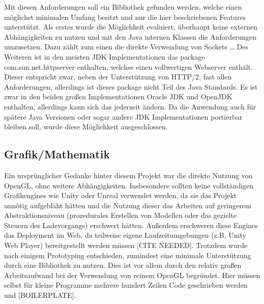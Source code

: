 Mit diesen Anforderungen soll ein Bibliothek gefunden werden, welche einen möglichst minimalen Umfang besitzt und nur die hier beschriebenen Features unterstützt. Als erstes wurde die Möglichkeit evaluiert, überhaupt keine externen Abhängigkeiten zu nutzen und mit den Java internen Klassen die Anforderungen umzusetzen. Dazu zählt zum einen die direkte Verwendung von Sockets …
Des Weiteren ist in den meisten JDK Implementationen das package com.sun.net.httpserver enthalten, welches einen vollwertigen Webserver enthält. Dieser entspricht zwar, neben der Unterstützung von HTTP/2, fast allen Anforderungen, allerdings ist dieses package nicht Teil des Java Standards. Es ist zwar in den beiden großen Implementationen Oracle JDK und OpenJDK enthalten, allerdings kann sich das jederzeit ändern. Da die Anwendung auch für spätere Java Versionen oder sogar andere JDK Implementationen portierbar bleiben soll, wurde diese Möglichkeit ausgeschlossen.


\subsection{Grafik/Mathematik}
Ein ursprünglicher Gedanke hinter diesem Projekt war die direkte Nutzung von OpenGL, ohne weitere Abhängigkeiten. Insbesondere sollten keine vollständigen Grafikengines wie Unity oder Unreal verwendet werden, da sie das Projekt unnötig aufgebläht hätten und die Nutzung dieser das Arbeiten auf geringerem Abstraktionsniveau (prozedurales Erstellen von Modellen oder das gezielte Steuern des Ladevorgangs) erschwert hätten. Außerdem erschweren diese Engines das Deployment im Web, da teilweise eigene Laufzeitumgebungen (z.B. Unity Web Player) bereitgestellt werden müssen [CITE NEEDED]. Trotzdem wurde nach einigem Prototyping entschieden, zumindest eine minimale Unterstützung durch eine Bibliothek zu nutzen. Dies ist vor allem durch den relativ großen Arbeitsaufwand bei der Verwendung von reinem OpenGL begründet. Hier müssen selbst für kleine Programme mehrere hundert Zeilen Code geschrieben werden und [BOILERPLATE].


